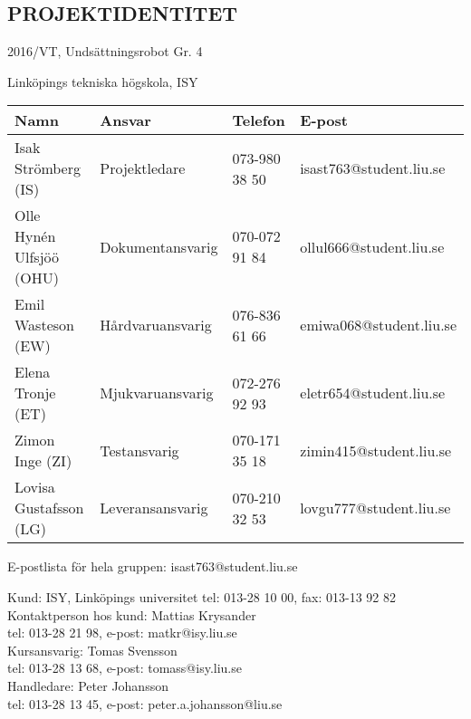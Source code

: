 \documentclass[11pt]{article}
\begin{document}
\pagebreak
\begin{center}

\section*{PROJEKTIDENTITET}
2016/VT, Undsättningsrobot Gr. 4

Linköpings tekniska högskola, ISY
\vspace{5em}

\begin{tabular}{|l|l|l|l|} \hline
\textbf{Namn} & \textbf{Ansvar} & \textbf{Telefon} & \textbf{E-post}  \\ \hline 
Isak Strömberg (IS) & Projektledare & 073-980 38 50 & isast763@student.liu.se \\ \hline
Olle Hynén Ulfsjöö (OHU)& Dokumentansvarig & 070-072 91 84 & ollul666@student.liu.se \\ \hline
Emil Wasteson (EW) & Hårdvaruansvarig & 076-836 61 66 & emiwa068@student.liu.se \\ \hline
Elena Tronje (ET) & Mjukvaruansvarig & 072-276 92 93 & eletr654@student.liu.se \\ \hline
Zimon Inge (ZI)& Testansvarig & 070-171 35 18 & zimin415@student.liu.se \\ \hline
Lovisa Gustafsson (LG) & Leveransansvarig & 070-210 32 53 & lovgu777@student.liu.se \\ \hline
\end{tabular}


E-postlista för hela gruppen: isast763@student.liu.se

\vspace{5em}
Kund: ISY, Linköpings universitet 
tel: 013-28 10 00, fax: 013-13 92 82 \\
Kontaktperson hos kund: Mattias Krysander \\
tel: 013-28 21 98, e-post: matkr@isy.liu.se \\

\vspace{5em}
Kursansvarig:  Tomas Svensson\\
tel: 013-28 13 68, e-post: tomass@isy.liu.se \\
Handledare: Peter Johansson \\
tel: 013-28 13 45, e-post: peter.a.johansson@liu.se
\end{center}
\pagebreak
\end{document}
